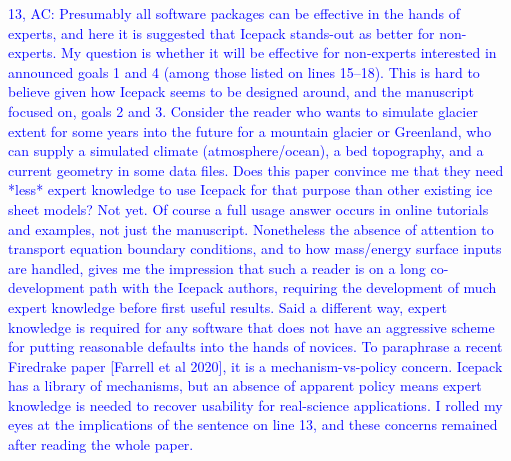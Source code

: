 \documentclass{article}
\theoremstyle{definition}
\theoremstyle{plain}
\begin{document}
\textcolor{blue}{13, AC:  Presumably all software packages can be effective in the hands of experts, and here it is suggested that Icepack stands-out as better for non-experts.  My question is whether it will be effective for non-experts interested in announced goals 1 and 4 (among those listed on lines 15--18).  This is hard to believe given how Icepack seems to be designed around, and the manuscript focused on, goals 2 and 3.  Consider the reader who wants to simulate glacier extent for some years into the future for a mountain glacier or Greenland, who can supply a simulated climate (atmosphere/ocean), a bed topography, and a current geometry in some data files.  Does this paper convince me that they need *less* expert knowledge to use Icepack for that purpose than other existing ice sheet models?  Not yet.  Of course a full usage answer occurs in online tutorials and examples, not just the manuscript.  Nonetheless the absence of attention to transport equation boundary conditions, and to how mass/energy surface inputs are handled, gives me the impression that such a reader is on a long co-development path with the Icepack authors, requiring the development of much expert knowledge before first useful results.  Said a different way, expert knowledge is required for any software that does not have an aggressive scheme for putting reasonable defaults into the hands of novices.  To paraphrase a recent Firedrake paper [Farrell et al 2020], it is a mechanism-vs-policy concern.  Icepack has a library of mechanisms, but an absence of apparent policy means expert knowledge is needed to recover usability for real-science applications.  I rolled my eyes at the implications of the sentence on line 13, and these concerns remained after reading the whole paper.}
\end{document}
